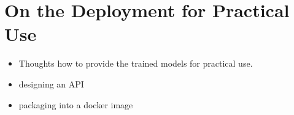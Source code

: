 \section{On the Deployment for Practical Use}
\begin{itemize}
    \item Thoughts how to provide the trained models for practical use.
    \item designing an API
    \item packaging into a docker image
\end{itemize}

\newpage
